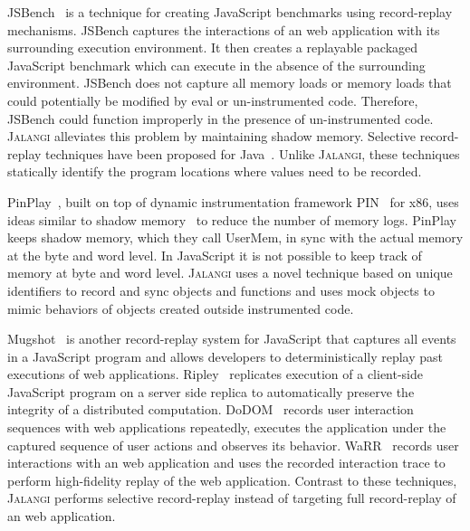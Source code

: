 \documentclass{sig-alternate}
\def\jalangi{\textsc{Jalangi}}
\begin{document}
JSBench~\cite{Richards:2011:ACJ:2048066.2048119} is a technique for
creating JavaScript benchmarks using record-replay mechanisms.
JSBench captures the interactions of an web application with its
surrounding execution environment.  It then creates a replayable
packaged JavaScript benchmark which can execute in the absence of the
surrounding environment. %
JSBench does not capture all memory loads or memory loads that could
potentially be modified by eval or un-instrumented code.  Therefore,
JSBench could function improperly in the presence of un-instrumented
code.  \jalangi{} alleviates this problem by maintaining shadow
memory. %
Selective record-replay techniques have been proposed for
Java~\cite{scarpe,Saff:2005:ATF:1101908.1101927}.  Unlike \jalangi{},
these techniques statically identify the program locations where
values need to be recorded.

PinPlay~\cite{Patil:2010:PFD:1772954.1772958}, built on top of dynamic
instrumentation framework PIN~\cite{Luk:2005:PBC:1065010.1065034} for
x86, uses ideas similar to shadow
memory~\cite{Narayanasamy:2006:ALO:1140277.1140303} to reduce the
number of memory logs.  PinPlay keeps shadow memory, which they call
UserMem, in sync with the actual memory at the byte and word level.
In JavaScript it is not possible to keep track of memory at byte and
word level.  \jalangi{} uses a novel technique based on unique
identifiers to record and sync objects and functions and uses mock
objects to mimic behaviors of objects created outside instrumented
code.  

Mugshot~\cite{Mickens:2010:MDC:1855711.1855722} is another
record-replay system for JavaScript that captures all events in a
JavaScript program and allows developers to deterministically replay
past executions of web applications.
Ripley~\cite{Vikram:2009:RAS:1653662.1653685} replicates execution of
a client-side JavaScript program on a server side replica to
automatically preserve the integrity of a distributed computation.
DoDOM~\cite{Pattabiraman:2010:DLD:1913797.1914375} records user
interaction sequences with web applications repeatedly, executes the
application under the captured sequence of user actions and observes
its behavior. %
WaRR~\cite{warr} records user interactions with an web application and
uses the recorded interaction trace to perform high-fidelity replay of
the web application.  Contrast to these techniques, \jalangi{}
performs selective record-replay instead of targeting full
record-replay of an web application.
\end{document}
